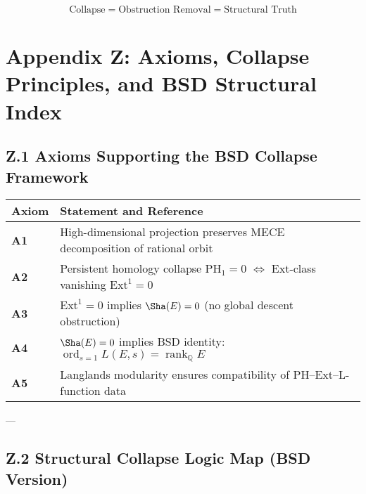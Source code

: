 \[
\text{Collapse} = \text{Obstruction Removal} = \text{Structural Truth}
\]





\section*{Appendix Z: Axioms, Collapse Principles, and BSD Structural Index}

\subsection*{Z.1 Axioms Supporting the BSD Collapse Framework}

\begin{tabular}{ll}
\textbf{Axiom} & \textbf{Statement and Reference} \\
\hline
\textbf{A1} & High-dimensional projection preserves MECE decomposition of rational orbit \quad [Appendix C] \\
\textbf{A2} & Persistent homology collapse \( \mathrm{PH}_1 = 0 \) \( \Longleftrightarrow \) Ext-class vanishing \( \mathrm{Ext}^1 = 0 \) \quad [Appendix B$^+$, G.5, G.7, Y] \\
\textbf{A3} & \( \mathrm{Ext}^1 = 0 \) implies \( \Sha(E) = 0 \) (no global descent obstruction) \quad [Appendix H.4, Y] \\
\textbf{A4} & \( \Sha(E) = 0 \) implies BSD identity: \( \operatorname{ord}_{s=1} L(E,s) = \operatorname{rank}_\mathbb{Q} E \) \quad [Appendix I, Y] \\
\textbf{A5} & Langlands modularity ensures compatibility of PH–Ext–L-function data \quad [Appendix D] \\
\end{tabular}

---

\subsection*{Z.2 Structural Collapse Logic Map (BSD Version)}

\begin{center}
\end{center}

